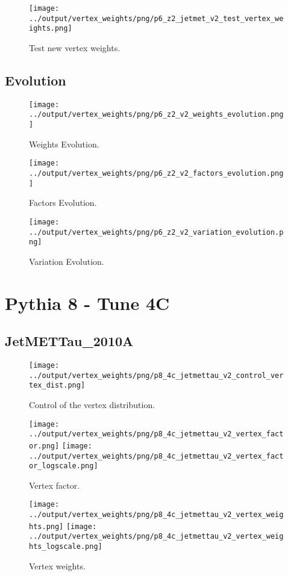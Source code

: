 \documentclass[11pt]{book}
\begin{document}
\begin{figure}[ht]
\centering
\texttt{[image: ../output/vertex\_weights/png/p6\_z2\_jetmet\_v2\_test\_vertex\_weights.png]}
\caption{Test new vertex weights.}
\end{figure}
\clearpage

\subsection{Evolution}
\begin{figure}[ht]
\centering
\texttt{[image: ../output/vertex\_weights/png/p6\_z2\_v2\_weights\_evolution.png]}
\caption{Weights Evolution.}
\end{figure}


\begin{figure}[ht]
\centering
\texttt{[image: ../output/vertex\_weights/png/p6\_z2\_v2\_factors\_evolution.png]}
\caption{Factors Evolution.}
\end{figure}

\begin{figure}[ht]
\centering
\texttt{[image: ../output/vertex\_weights/png/p6\_z2\_v2\_variation\_evolution.png]}
\caption{Variation Evolution.}
\end{figure}
\clearpage

\section{Pythia 8 - Tune 4C}
\subsection{JetMETTau\_2010A}
\begin{figure}[ht]
\centering
\texttt{[image: ../output/vertex\_weights/png/p8\_4c\_jetmettau\_v2\_control\_vertex\_dist.png]}
\caption{Control of the vertex distribution.}
\end{figure}

\begin{figure}[ht]
\centering
\texttt{[image: ../output/vertex\_weights/png/p8\_4c\_jetmettau\_v2\_vertex\_factor.png]}
\texttt{[image: ../output/vertex\_weights/png/p8\_4c\_jetmettau\_v2\_vertex\_factor\_logscale.png]}
\caption{Vertex factor.}
\end{figure}

\begin{figure}[ht]
\centering
\texttt{[image: ../output/vertex\_weights/png/p8\_4c\_jetmettau\_v2\_vertex\_weights.png]}
\texttt{[image: ../output/vertex\_weights/png/p8\_4c\_jetmettau\_v2\_vertex\_weights\_logscale.png]}
\caption{Vertex weights.}
\end{figure}
\end{document}

